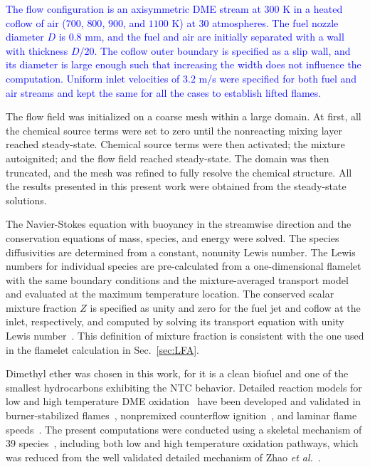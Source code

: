 \documentclass[review,3p,times]{elsarticle}
\begin{document}
\textcolor{blue}{The flow configuration is an axisymmetric DME stream at $300$ K in a heated coflow of air ($700$, $800$, $900$, and $1100$ K) at $30$ atmospheres.  The fuel nozzle diameter $D$ is $0.8$ mm, and the fuel and air are initially separated with a wall with thickness $D/20$.  The coflow outer boundary is specified as a slip wall, and its diameter is large enough such that increasing the width does not influence the computation.  Uniform inlet velocities of $3.2$ m/s were specified for both fuel and air streams and kept the same for all the cases to establish lifted flames.}


The flow field was initialized on a coarse mesh within a large domain.  At first, all the chemical source terms were set to zero until the nonreacting mixing layer reached steady-state.  Chemical source terms were then activated; the mixture autoignited; and the flow field reached steady-state.  The domain was then truncated, and the mesh was refined to fully resolve the chemical structure.  All the results presented in this present work were obtained from the steady-state solutions.  

The Navier-Stokes equation with buoyancy in the streamwise direction and the conservation equations of mass, species, and energy were solved.  The species diffusivities are determined from a constant, nonunity Lewis number.  The Lewis numbers for individual species are pre-calculated from a one-dimensional flamelet with the same boundary conditions and the mixture-averaged transport model and evaluated at the maximum temperature location.  The conserved scalar mixture fraction $Z$ is specified as unity and zero for the fuel jet and coflow at the inlet, respectively, and computed by solving its transport equation with unity Lewis number~\cite{pitsch98b}.  This definition of mixture fraction is consistent with the one used in the flamelet calculation in Sec.~\ref{sec:LFA}.

Dimethyl ether was chosen in this work, for it is a clean biofuel and one of the smallest hydrocarbons exhibiting the NTC behavior. Detailed reaction models for low and high temperature DME oxidation~\cite{curran98,fischer00,curran00,zhao08} have been developed and validated in burner-stabilized flames~\cite{kaiser00}, nonpremixed counterflow ignition~\cite{zheng05}, and laminar flame speeds~\cite{qin05}.  The present computations were conducted using a skeletal mechanism of $39$ species~\cite{bhagatwala15}, including both low and high temperature oxidation pathways, which was reduced from the well validated detailed mechanism of Zhao \emph{et al.}~\cite{zhao08}. 
\end{document}
